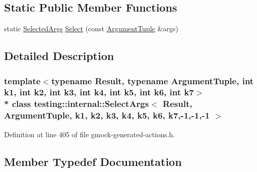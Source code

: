 \subsection*{Static Public Member Functions}
\begin{DoxyCompactItemize}
\item 
static \hyperlink{classtesting_1_1internal_1_1_select_args_3_01_result_00_01_argument_tuple_00_01k1_00_01k2_00_01k597f472c4e3b394b8bb76f22686b8756_a921cc8e0f8e0453024d95e80933e7346}{Selected\+Args} \hyperlink{classtesting_1_1internal_1_1_select_args_3_01_result_00_01_argument_tuple_00_01k1_00_01k2_00_01k597f472c4e3b394b8bb76f22686b8756_a8521db3b77ca57c380be1adef0e2cfc8}{Select} (const \hyperlink{typedefs__d_8js_a396b2bdc7ef45f482a7e9254b15c3c01}{Argument\+Tuple} \&args)
\end{DoxyCompactItemize}


\subsection{Detailed Description}
\subsubsection*{template$<$typename Result, typename Argument\+Tuple, int k1, int k2, int k3, int k4, int k5, int k6, int k7$>$\\*
class testing\+::internal\+::\+Select\+Args$<$ Result, Argument\+Tuple, k1, k2, k3, k4, k5, k6, k7,-\/1,-\/1,-\/1 $>$}



Definition at line 405 of file gmock-\/generated-\/actions.\+h.



\subsection{Member Typedef Documentation}
